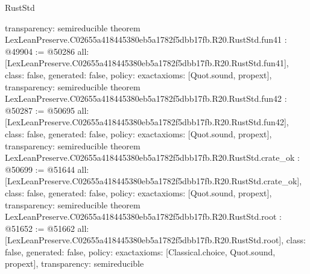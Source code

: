 \begin{lexlean}{RustStd}
\begin{coremodule}
{  transparency: semireducible
}
theorem LexLeanPreserve.C02655a418445380eb5a1782f5dbb17fb.R20.RustStd.fun41 : @49904 := @50286 {
  all: [LexLeanPreserve.C02655a418445380eb5a1782f5dbb17fb.R20.RustStd.fun41],
  class: false,
  generated: false,
  policy: exact{axioms: [Quot.sound, propext]},
  transparency: semireducible
}
theorem LexLeanPreserve.C02655a418445380eb5a1782f5dbb17fb.R20.RustStd.fun42 : @50287 := @50695 {
  all: [LexLeanPreserve.C02655a418445380eb5a1782f5dbb17fb.R20.RustStd.fun42],
  class: false,
  generated: false,
  policy: exact{axioms: [Quot.sound, propext]},
  transparency: semireducible
}
theorem LexLeanPreserve.C02655a418445380eb5a1782f5dbb17fb.R20.RustStd.crate_ok : @50699 := @51644 {
  all: [LexLeanPreserve.C02655a418445380eb5a1782f5dbb17fb.R20.RustStd.crate_ok],
  class: false,
  generated: false,
  policy: exact{axioms: [Quot.sound, propext]},
  transparency: semireducible
}
theorem LexLeanPreserve.C02655a418445380eb5a1782f5dbb17fb.R20.RustStd.root : @51652 := @51662 {
  all: [LexLeanPreserve.C02655a418445380eb5a1782f5dbb17fb.R20.RustStd.root],
  class: false,
  generated: false,
  policy: exact{axioms: [Classical.choice, Quot.sound, propext]},
  transparency: semireducible
}


\end{coremodule}
\end{lexlean}

